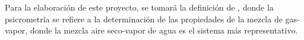 
    Para la elaboración de este proyecto, se tomará la definición de \parencite[]{bib:Perry2000}, donde la psicrometría se refiere a la determinación de las propiedades de la mezcla de gas-vapor, donde la mezcla aire seco-vapor de agua es el sistema más representativo.







